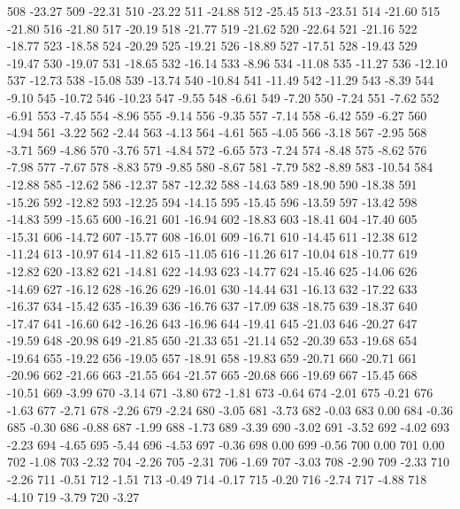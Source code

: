 508 -23.27
509 -22.31
510 -23.22
511 -24.88
512 -25.45
513 -23.51
514 -21.60
515 -21.80
516 -21.80
517 -20.19
518 -21.77
519 -21.62
520 -22.64
521 -21.16
522 -18.77
523 -18.58
524 -20.29
525 -19.21
526 -18.89
527 -17.51
528 -19.43
529 -19.47
530 -19.07
531 -18.65
532 -16.14
533 -8.96
534 -11.08
535 -11.27
536 -12.10
537 -12.73
538 -15.08
539 -13.74
540 -10.84
541 -11.49
542 -11.29
543 -8.39
544 -9.10
545 -10.72
546 -10.23
547 -9.55
548 -6.61
549 -7.20
550 -7.24
551 -7.62
552 -6.91
553 -7.45
554 -8.96
555 -9.14
556 -9.35
557 -7.14
558 -6.42
559 -6.27
560 -4.94
561 -3.22
562 -2.44
563 -4.13
564 -4.61
565 -4.05
566 -3.18
567 -2.95
568 -3.71
569 -4.86
570 -3.76
571 -4.84
572 -6.65
573 -7.24
574 -8.48
575 -8.62
576 -7.98
577 -7.67
578 -8.83
579 -9.85
580 -8.67
581 -7.79
582 -8.89
583 -10.54
584 -12.88
585 -12.62
586 -12.37
587 -12.32
588 -14.63
589 -18.90
590 -18.38
591 -15.26
592 -12.82
593 -12.25
594 -14.15
595 -15.45
596 -13.59
597 -13.42
598 -14.83
599 -15.65
600 -16.21
601 -16.94
602 -18.83
603 -18.41
604 -17.40
605 -15.31
606 -14.72
607 -15.77
608 -16.01
609 -16.71
610 -14.45
611 -12.38
612 -11.24
613 -10.97
614 -11.82
615 -11.05
616 -11.26
617 -10.04
618 -10.77
619 -12.82
620 -13.82
621 -14.81
622 -14.93
623 -14.77
624 -15.46
625 -14.06
626 -14.69
627 -16.12
628 -16.26
629 -16.01
630 -14.44
631 -16.13
632 -17.22
633 -16.37
634 -15.42
635 -16.39
636 -16.76
637 -17.09
638 -18.75
639 -18.37
640 -17.47
641 -16.60
642 -16.26
643 -16.96
644 -19.41
645 -21.03
646 -20.27
647 -19.59
648 -20.98
649 -21.85
650 -21.33
651 -21.14
652 -20.39
653 -19.68
654 -19.64
655 -19.22
656 -19.05
657 -18.91
658 -19.83
659 -20.71
660 -20.71
661 -20.96
662 -21.66
663 -21.55
664 -21.57
665 -20.68
666 -19.69
667 -15.45
668 -10.51
669 -3.99
670 -3.14
671 -3.80
672 -1.81
673 -0.64
674 -2.01
675 -0.21
676 -1.63
677 -2.71
678 -2.26
679 -2.24
680 -3.05
681 -3.73
682 -0.03
683 0.00
684 -0.36
685 -0.30
686 -0.88
687 -1.99
688 -1.73
689 -3.39
690 -3.02
691 -3.52
692 -4.02
693 -2.23
694 -4.65
695 -5.44
696 -4.53
697 -0.36
698 0.00
699 -0.56
700 0.00
701 0.00
702 -1.08
703 -2.32
704 -2.26
705 -2.31
706 -1.69
707 -3.03
708 -2.90
709 -2.33
710 -2.26
711 -0.51
712 -1.51
713 -0.49
714 -0.17
715 -0.20
716 -2.74
717 -4.88
718 -4.10
719 -3.79
720 -3.27
